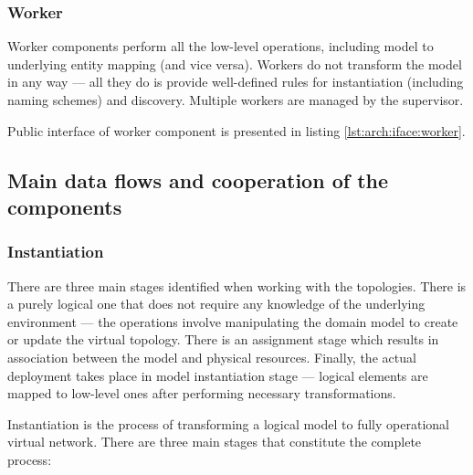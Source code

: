 \documentclass[11pt,openany]{book}
\begin{document}
        \subsubsection{Worker}

          Worker components perform all the low-level operations, including model to underlying entity mapping (and vice
          versa). Workers do not transform the model in any way --- all they do is provide well-defined rules for
          instantiation (including naming schemes) and discovery. Multiple workers are managed by the supervisor.

          Public interface of worker component is presented in listing \ref{lst:arch:iface:worker}. \\

          \noindent
          \begin{minipage}{\textwidth}
            
          \end{minipage}


      \subsection{Main data flows and cooperation of the components}

        \subsubsection{Instantiation}

          There are three main stages identified when working with the topologies. There is a purely logical one that
          does not require any knowledge of the underlying environment --- the operations involve manipulating the
          domain model to create or update the virtual topology. There is an assignment stage which results in
          association between the model and physical resources. Finally, the actual deployment takes place in model
          instantiation stage --- logical elements are mapped to low-level ones after performing necessary
          transformations.

          Instantiation is the process of transforming a logical model to fully operational virtual network. There are
          three main stages that constitute the complete process:
\end{document}
